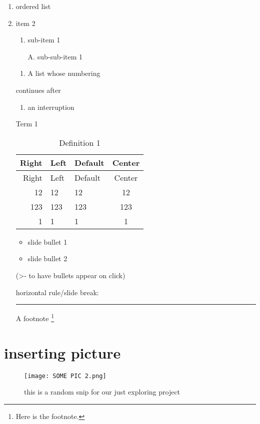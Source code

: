 \documentclass[
]{article}
\providecommand{\tightlist}{%
  \setlength{\itemsep}{0pt}\setlength{\parskip}{0pt}}
\begin{document}
\begin{enumerate}
\def\labelenumi{\arabic{enumi}.}
\item
  ordered list
\item
  item 2

  \begin{enumerate}
  \def\labelenumii{\roman{enumii})}
  \item
    sub-item 1

    A. sub-sub-item 1
  \end{enumerate}

  \begin{enumerate}
  \def\labelenumii{(\arabic{enumii})}
  \tightlist
  \item
    A list whose numbering
  \end{enumerate}

  continues after

  \begin{enumerate}
  \def\labelenumii{(\arabic{enumii})}
  \setcounter{enumii}{1}
  \tightlist
  \item
    an interruption
  \end{enumerate}

  Term 1

  \begin{longtable}[]{@{}rllc@{}}
  \caption{Definition 1}\tabularnewline
  \toprule()
  Right & Left & Default & Center \\
  \midrule()
  \endfirsthead
  \toprule()
  Right & Left & Default & Center \\
  \midrule()
  \endhead
  12 & 12 & 12 & 12 \\
  123 & 123 & 123 & 123 \\
  1 & 1 & 1 & 1 \\
  \bottomrule()
  \end{longtable}

  \begin{itemize}
  \item
    slide bullet 1
  \item
    slide bullet 2
  \end{itemize}

  (\textgreater- to have bullets appear on click)

  horizontal rule/slide break:

  \begin{center}\rule{0.5\linewidth}{0.5pt}\end{center}

  A footnote \footnote{Here is the footnote.}
\end{enumerate}

\hypertarget{inserting-picture}{%
\section{inserting picture}\label{inserting-picture}}

\begin{figure}
\centering
\texttt{[image: SOME PIC 2.png]}
\caption{this is a random snip for our just exploring project}
\end{figure}
\end{document}
